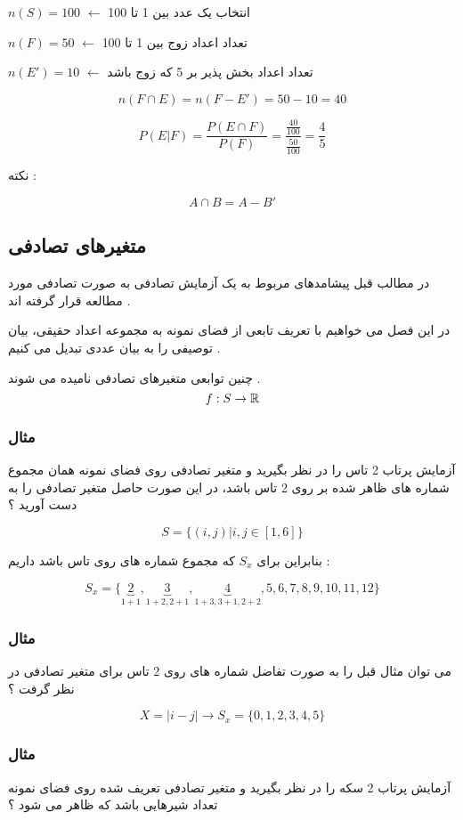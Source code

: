 \documentclass[12pt]{book}
\begin{document}
$n(S) = 100$ $\leftarrow$ انتخاب یک عدد بین 1 تا 100

$n(F) = 50$ $\leftarrow$ تعداد اعداد زوج بین 1 تا 100

$n(E') = 10$ $\leftarrow$ تعداد اعداد بخش پذیر بر 5 که زوج باشد

$$
n ( F \cap E ) = n ( F - E' ) = 50 - 10 = 40
$$


$$
P( E | F ) =  \frac{P( E \cap F )}{P(F)}  = \frac{\frac{40}{100}}{\frac{50}{100}}  = \frac{4}{5}
$$


نکته :

$$
A \cap B = A - B'
$$



\subsection{متغیرهای تصادفی}
در مطالب قبل پیشامدهای مربوط به یک آزمایش تصادفی به صورت تصادفی مورد مطالعه قرار گرفته اند .

در این فصل می خواهیم با تعریف تابعی از فضای نمونه به مجموعه اعداد حقیقی، بیان توصیفی را به بیان عددی تبدیل می کنیم .

چنین توابعی متغیرهای تصادفی نامیده می شوند .
$$
f : S \to {\Bbb R}
$$


\subsubsection{مثال}
آزمایش پرتاب 2 تاس را در نظر بگیرید و متغیر تصادفی روی فضای نمونه همان مجموع شماره های ظاهر شده بر روی 2 تاس باشد، در این صورت حاصل متغیر تصادفی را به دست آورید ؟

$$
S = \{ ( i , j ) | i , j \in [ 1 , 6 ] \}
$$


بنابراین برای $S_{x}$ که مجموع شماره های روی تاس باشد داریم :

$$
S_{x} = \{ \underbrace{2}_{1+1} , \underbrace{3}_{1+2 , 2+1} , \underbrace{4}_{1+3 , 3+1 , 2+2} , 5 , 6 , 7 , 8 , 9 , 10 , 11 , 12 \} 
$$

\subsubsection{مثال}
می توان مثال قبل را به صورت تفاضل شماره های روی 2 تاس برای متغیر تصادفی در نظر گرفت ؟

$$
X = | i - j | \to S_{x} = \{ 0 , 1 , 2 , 3 , 4 , 5 \}
$$



\subsubsection{مثال}
آزمایش پرتاب 2 سکه را در نظر بگیرید و متغیر تصادفی تعریف شده روی فضای نمونه تعداد شیرهایی باشد که ظاهر می شود ؟
\end{document}

